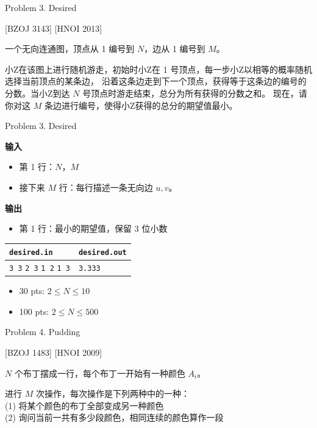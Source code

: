 \documentclass[UTF8]{beamer}
\begin{document}

\begin{frame}{Problem 3. Desired}

[BZOJ 3143] [HNOI 2013]

一个无向连通图，顶点从 1 编号到 $N$，边从 1 编号到 $M$。

小Z在该图上进行随机游走，初始时小Z在 1 号顶点，每一步小Z以相等的概率随机选择当前顶点的某条边，
沿着这条边走到下一个顶点，获得等于这条边的编号的分数。当小Z到达 $N$ 号顶点时游走结束，总分为所有获得的分数之和。
现在，请你对这 $M$ 条边进行编号，使得小Z获得的总分的期望值最小。

\end{frame}

\begin{frame}{Problem 3. Desired}

\textbf{输入}
\begin{itemize}
    \item 第 1 行：$N$，$M$
    \item 接下来 $M$ 行：每行描述一条无向边 $u, v$。
\end{itemize}
\textbf{输出}
\begin{itemize}
    \item 第 1 行：最小的期望值，保留 3 位小数
\end{itemize}

\begin{tabularx}{\textwidth}{|X|X|}
\hline
\texttt{\textbf{desired.in}} & \texttt{\textbf{desired.out}} \\ \hline
\texttt{3 3}\newline
\texttt{2 3}\newline
\texttt{1 2}\newline
\texttt{1 3}
&
\texttt{3.333}
\\ \hline
\end{tabularx}
\newline
\begin{itemize}
    \item 30 pts: $2 \leq N \leq 10$
    \item 100 pts: $2 \leq N \leq 500$
\end{itemize}

\end{frame}


\begin{frame}{Problem 4. Pudding}

[BZOJ 1483] [HNOI 2009]

$N$ 个布丁摆成一行，每个布丁一开始有一种颜色 $A_i$。

进行 $M$ 次操作，每次操作是下列两种中的一种： \\
(1) 将某个颜色的布丁全部变成另一种颜色 \\
(2) 询问当前一共有多少段颜色，相同连续的颜色算作一段

\end{frame}
\end{document}
